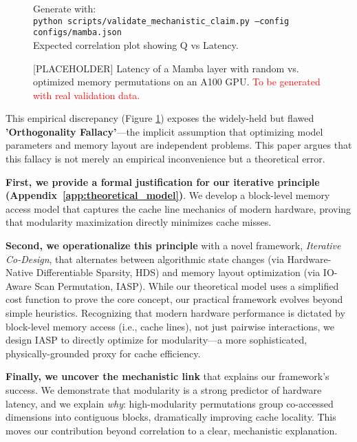 \documentclass{article}
\begin{document}
\begin{figure}[htbp]
\centering
\begin{datawarning}
Generate with: \\
\texttt{python scripts/validate\_mechanistic\_claim.py --config configs/mamba.json}\\
Expected correlation plot showing Q vs Latency.
\end{datawarning}
\caption{[PLACEHOLDER] Latency of a Mamba layer with random vs. optimized memory permutations on an A100 GPU. \textcolor{red}{To be generated with real validation data.}}
\label{fig:mamba_latency}
\end{figure}

This empirical discrepancy (Figure \ref{fig:mamba_latency}) exposes the widely-held but flawed \textbf{'Orthogonality Fallacy'}—the implicit assumption that optimizing model parameters and memory layout are independent problems. This paper argues that this fallacy is not merely an empirical inconvenience but a theoretical error.

\textbf{First, we provide a formal justification for our iterative principle (Appendix~\ref{app:theoretical_model})}. We develop a block-level memory access model that captures the cache line mechanics of modern hardware, proving that modularity maximization directly minimizes cache misses.

\textbf{Second, we operationalize this principle} with a novel framework, \textit{Iterative Co-Design}, that alternates between algorithmic state changes (via Hardware-Native Differentiable Sparsity, HDS) and memory layout optimization (via IO-Aware Scan Permutation, IASP). While our theoretical model uses a simplified cost function to prove the core concept, our practical framework evolves beyond simple heuristics. Recognizing that modern hardware performance is dictated by block-level memory access (i.e., cache lines), not just pairwise interactions, we design IASP to directly optimize for modularity—a more sophisticated, physically-grounded proxy for cache efficiency.

\textbf{Finally, we uncover the mechanistic link} that explains our framework's success. We demonstrate that modularity is a strong predictor of hardware latency, and we explain \textit{why}: high-modularity permutations group co-accessed dimensions into contiguous blocks, dramatically improving cache locality. This moves our contribution beyond correlation to a clear, mechanistic explanation.
\end{document}

